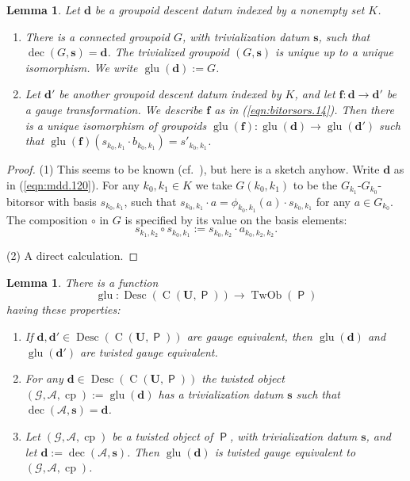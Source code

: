 \documentclass[a4paper, 10pt]{amsart}
\newtheorem{lem}[equation]{Lemma}
\theoremstyle{definition}
\numberwithin{equation}{section}
\newcommand{\opn}{\operatorname}
\newcommand{\cat}[1]{\operatorname{\mathsf{#1}}}
\newcommand{\rmitem}[1]{\item[\text{\textup{(#1)}}]}
\newcommand{\mcal}[1]{\mathcal{#1}}
\newcommand{\tup}[1]{\textup{#1}}
\newcommand{\bsym}[1]{\boldsymbol{#1}}
\newcommand{\gerbe}[1]{\bsym{\mcal{#1}}}
\newcommand{\twocat}[1]{\operatorname{\bsym{\cat{#1}}}}
\begin{document}
\begin{lem} \label{lem:bitorsors.3}
Let $\bsym{d}$ be a groupoid descent datum indexed by a nonempty set $K$. 
\begin{enumerate}
\item There is a connected groupoid $G$, with 
trivialization datum $\bsym{s}$, such that 
$\opn{dec}(G, \bsym{s}) = \bsym{d}$.
The trivialized groupoid $(G, \bsym{s})$ is unique up to a unique
isomorphism. We write $\opn{glu}(\bsym{d}) := G$.

\item Let $\bsym{d}'$ be another groupoid descent datum indexed by
$K$, and let $\bsym{f} : \bsym{d} \to \bsym{d}'$ be a gauge
transformation. We describe $\bsym{f}$ as in \tup{(\ref{eqn:bitorsors.14})}.
Then there is a unique isomorphism of groupoids 
$\opn{glu}(\bsym{f}) : \opn{glu}(\bsym{d}) \to \opn{glu}(\bsym{d}')$ 
such that 
$\opn{glu}(\bsym{f})(s_{k_0, k_1} \cdot b_{k_0, k_1}) = s'_{k_0, k_1}$.
\end{enumerate}
\end{lem}

\begin{proof}
(1) This seems to be known (cf.\ \cite[Appendix A1]{Ko2}), but here is a sketch
anyhow. Write $\bsym{d}$ as in (\ref{eqn:mdd.120}).
For any $k_0, k_1 \in K$ we take $G(k_0, k_1)$ to be the 
$G_{k_1}$-$G_{k_0}$-bitorsor with basis 
$s_{k_0, k_1}$, such that 
$s_{k_0, k_1} \cdot a = \phi_{k_0, k_1}(a) \cdot s_{k_0, k_1}$
for any $a \in G_{k_0}$.
The composition $\circ$ in $G$ is specified by its value on the basis
elements:
\[ s_{k_1, k_2} \circ s_{k_0, k_1} := s_{k_0, k_2} \cdot a_{k_0, k_2, k_2} . \]

\medskip \noindent
(2) A direct calculation.
\end{proof}

\begin{lem}  \label{lem:bitorsors.9}
There is a function 
\[ \opn{glu} : \opn{Desc}(\opn{C}(\bsym{U}, \twocat{P})) \to 
\opn{TwOb}(\twocat{P}) \]
having these properties\tup{:}
\begin{enumerate}
\rmitem{i} If 
$\bsym{d}, \bsym{d}' \in \opn{Desc}(\opn{C}(\bsym{U}, \twocat{P}))$
are gauge equivalent, then $\opn{glu}(\bsym{d})$ and 
$\opn{glu}(\bsym{d}')$ are twisted gauge equivalent.

\rmitem{ii} For any $\bsym{d} \in \opn{Desc}(\opn{C}(\bsym{U}, \twocat{P}))$
the twisted object 
$(\gerbe{G}, \gerbe{A}, \opn{cp}) := \opn{glu}(\bsym{d})$ has a 
trivialization datum $\bsym{s}$ such that 
$\opn{dec}(\gerbe{A}, \bsym{s})= \bsym{d}$.

\rmitem{iii} Let $(\gerbe{G}, \gerbe{A}, \opn{cp})$
be a twisted object of $\twocat{P}$, with trivialization datum
$\bsym{s}$, and let $\bsym{d} := \opn{dec}(\gerbe{A}, \bsym{s})$.
Then $\opn{glu}(\bsym{d})$ is twisted gauge equivalent to 
$(\gerbe{G}, \gerbe{A}, \opn{cp})$.
\end{enumerate}
\end{lem}
\end{document}
